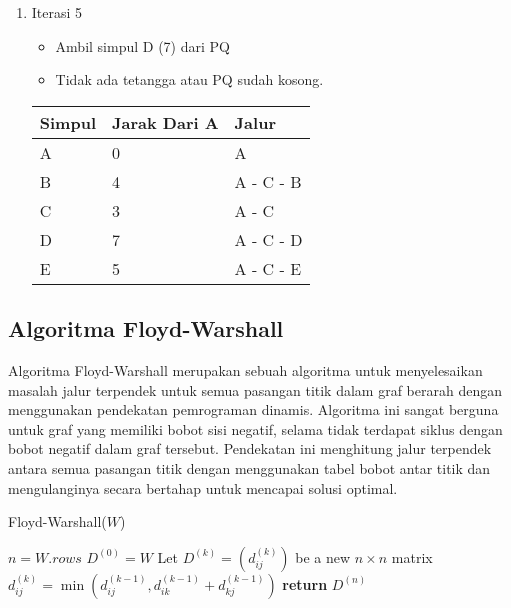 \begin{enumerate}
    \item Iterasi 5
    \begin{itemize}
        \item Ambil simpul D (7) dari PQ
        \item Tidak ada tetangga atau PQ sudah kosong.
    \end{itemize}
    \begin{table}[h]
        \begin{tabular}{|l|l|l|}
        \hline
            \textbf{Simpul} & \textbf{Jarak Dari A} & \textbf{Jalur} \\ \hline
            A               & 0                     & A     \\ \hline
            B               & 4                     & A - C - B     \\ \hline
            C               & 3                     & A - C     \\ \hline
            D               & 7                     & A - C - D     \\ \hline
            E               & 5                     & A - C - E     \\ \hline
        \end{tabular}
    \end{table}
\end{enumerate}

\subsection{Algoritma Floyd-Warshall ~\cite{Cormen:09:intro}}
\label{floydwarshall}
Algoritma Floyd-Warshall merupakan sebuah algoritma untuk menyelesaikan masalah jalur terpendek untuk semua pasangan titik dalam graf berarah dengan menggunakan pendekatan pemrograman dinamis. Algoritma ini sangat berguna untuk graf yang memiliki bobot sisi negatif, selama tidak terdapat siklus dengan bobot negatif dalam graf tersebut. Pendekatan ini menghitung jalur terpendek antara semua pasangan titik dengan menggunakan tabel bobot antar titik dan mengulanginya secara bertahap untuk mencapai solusi optimal.
\begin{algorithm}[H]
    \caption{Floyd-Warshall($W$)}
    \label{alg:floydwarshall}
    \begin{algorithmic}[1]
        \State $n = W.rows$
        \State $D^{(0)} = W$
            \State Let $D^{(k)} = (d_{ij}^{(k)})$ be a new $n \times n$ matrix
                    \State $d_{ij}^{(k)} = \min(d_{ij}^{(k-1)}, d_{ik}^{(k-1)} + d_{kj}^{(k-1)})$
                \EndFor
            \EndFor
        \EndFor
        \State \textbf{return} $D^{(n)}$
    \end{algorithmic}
\end{algorithm}

